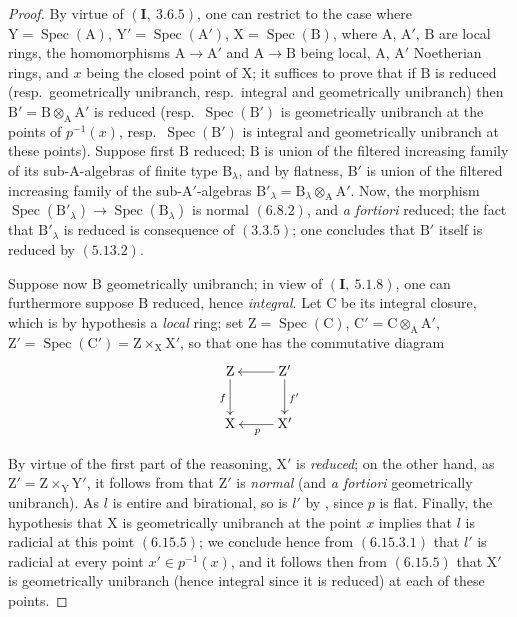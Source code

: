 \begin{proof}
By virtue of $(\mathbf{I},~3.6.5)$, one can restrict to the case where $\mathrm{Y}=\operatorname{Spec}(\mathrm{A})$, $\mathrm{Y}'=\operatorname{Spec}(\mathrm{A}')$,
$\mathrm{X}=\operatorname{Spec}(\mathrm{B})$, where $\mathrm{A}$, $\mathrm{A}'$, $\mathrm{B}$ are local rings, the homomorphisms $\mathrm{A}\to\mathrm{A}'$
and $\mathrm{A}\to\mathrm{B}$ being local, $\mathrm{A}$, $\mathrm{A}'$ Noetherian rings, and $x$ being the closed point of $\mathrm{X}$;
it suffices to prove that if $\mathrm{B}$ is reduced (resp.\ geometrically unibranch,
resp.\ integral and geometrically unibranch) then $\mathrm{B}'=\mathrm{B}\otimes_\mathrm{A}\mathrm{A}'$ is reduced (resp.\ $\operatorname{Spec}(\mathrm{B}')$ is geometrically
unibranch at the points of $p^{-1}(x)$, resp.\ $\operatorname{Spec}(\mathrm{B}')$ is integral and geometrically
unibranch at these points). Suppose first $\mathrm{B}$ reduced; $\mathrm{B}$ is
union of the filtered increasing family of its sub-$\mathrm{A}$-algebras of finite type $\mathrm{B}_\lambda$, and by flatness, $\mathrm{B}'$ is
union of the filtered increasing family of the sub-$\mathrm{A}'$-algebras $\mathrm{B}'_\lambda=\mathrm{B}_\lambda\otimes_\mathrm{A}\mathrm{A}'$. Now, the
morphism $\operatorname{Spec}(\mathrm{B}'_\lambda)\to\operatorname{Spec}(\mathrm{B}_\lambda)$ is normal $(6.8.2)$, and \emph{a fortiori} reduced; the fact that $\mathrm{B}'_\lambda$
is reduced is consequence of $(3.3.5)$; one concludes that $\mathrm{B}'$ itself is reduced
by $(5.13.2)$.

Suppose now $\mathrm{B}$ geometrically unibranch; in view of $(\mathbf{I},~5.1.8)$,
one can furthermore suppose $\mathrm{B}$ reduced, hence \emph{integral}. Let $\mathrm{C}$ be its integral closure, which is
by hypothesis a \emph{local} ring; set $\mathrm{Z}=\operatorname{Spec}(\mathrm{C})$, $\mathrm{C}'=\mathrm{C}\otimes_\mathrm{A}\mathrm{A}'$, $\mathrm{Z}'=\operatorname{Spec}(\mathrm{C}')=\mathrm{Z}\times_\mathrm{X}\mathrm{X}'$,
so that one has the commutative diagram
\[
\xymatrix{
  \mathrm{Z} \ar[d]_{f} & \mathrm{Z}' \ar[l] \ar[d]^{f'} \\
  \mathrm{X} & \mathrm{X}' \ar[l]^{p}
}
\]

By virtue of the first part of the reasoning, $\mathrm{X}'$ is \emph{reduced}; on the other hand, as
$\mathrm{Z}'=\mathrm{Z}\times_\mathrm{Y}\mathrm{Y}'$, it follows from  that $\mathrm{Z}'$ is \emph{normal} (and \emph{a fortiori} geometrically
unibranch). As $l$ is entire and birational, so is $l'$ by
, since $p$ is flat. Finally, the hypothesis that $\mathrm{X}$ is geometrically
unibranch at the point $x$ implies that $l$ is radicial at this point $(6.15.5)$; we conclude
hence from $(6.15.3.1)$ that $l'$ is radicial at every point $x'\in p^{-1}(x)$, and it follows then from
$(6.15.5)$ that $\mathrm{X}'$ is geometrically unibranch (hence integral since it is reduced)
at each of these points.
\end{proof}

